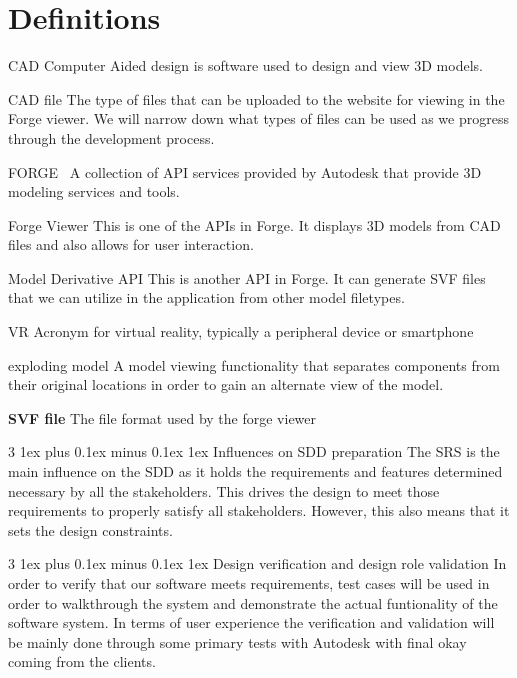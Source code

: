 \documentclass[letterpaper, 10pt, draftclsnofoot, compsoc, onecolumn]{IEEEtran}
\makeatletter
\def\subsubsection{\@startsection{subsubsection}%
                                 {3}%
                                 {\z@}%
                                 {1ex plus 0.1ex minus 0.1ex}%
                                 {1ex}%
                                 {\normalfont\normalsize}}%
\makeatother
\begin{document}
\section{Definitions}
\begin{description}
	\item{CAD} Computer Aided design is software used to design and view 3D models.

	\item{CAD file} The type of files that can be uploaded to the website for viewing in the Forge viewer. 
	We will  narrow down what types of files can be used as we progress through the development process.

	\item{FORGE}~\cite{forge2016} A collection of API services provided by Autodesk that provide 3D modeling services and tools.

	\item{Forge Viewer} This is one of the APIs in Forge. It displays 3D models from CAD files and also allows
	for user interaction.
	
	\item{Model Derivative API} This is another API in Forge. It can generate SVF files that we can utilize in the application from other model filetypes.
	
	\item{VR} Acronym for virtual reality, typically a peripheral device or smartphone

	\item{exploding model} A model viewing functionality that separates components from their original locations in order to gain an alternate view of the model.

	\item\textbf{SVF file} The file format used by the forge viewer
\end{description} 

\subsubsection{Influences on SDD preparation}
The SRS is the main influence on the SDD as it holds the requirements and features determined necessary by all the stakeholders. This drives the design to meet those requirements to properly satisfy all stakeholders. However, this also means that it sets the design constraints.

\subsubsection{Design verification and design role validation}
In order to verify that our software meets requirements, test cases will be used in order to walkthrough the system and demonstrate the actual funtionality of the software system. In terms of user experience the verification and validation will be mainly done through some primary tests with Autodesk with final okay coming from the clients.
\end{document}
